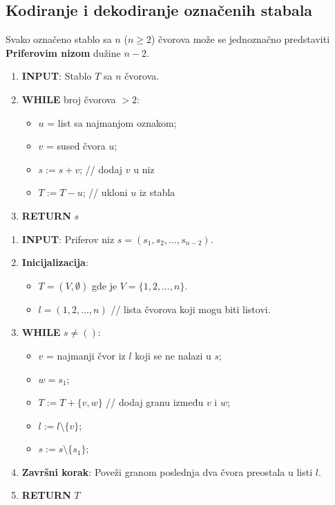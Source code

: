 \documentclass[a4paper,12pt,twoside]{report}
\numberwithin{algorithm}{section}
\begin{document}
\subsection{Kodiranje i dekodiranje označenih stabala}
Svako označeno stablo sa $n$ ($n \geq 2$) čvorova može se jednoznačno predstaviti \textbf{Priferovim nizom} dužine $n-2$.
\vfill
\begin{algorithm}[!h]
    \caption{Priferovo kodiranje}
    \begin{enumerate}
        \item \textbf{INPUT}: Stablo $T$ sa $n$ čvorova.
        \item \textbf{WHILE} broj čvorova $> 2$:
        \begin{itemize}
            \item $u$ = list sa najmanjom oznakom;
            \item $v$ = sused čvora $u$;
            \item $s := s + v$; // dodaj $v$ u niz
            \item $T := T - u$; // ukloni $u$ iz stabla
        \end{itemize}
        \item \textbf{RETURN} $s$
    \end{enumerate}
\end{algorithm}
\vfill
\newpage
\begin{algorithm}[!h]
    \caption{Priferovo dekodiranje}
    \begin{enumerate}
        \item \textbf{INPUT}: Priferov niz $s = (s_1, s_2, \ldots, s_{n-2})$.
        \item \textbf{Inicijalizacija}:
        \begin{itemize}
            \item $T = (V, \emptyset)$ gde je $V = \{1, 2, \ldots, n\}$.
            \item $l = (1, 2, \ldots, n)$ // lista čvorova koji mogu biti listovi.
        \end{itemize}
        \item \textbf{WHILE} $s \neq ()$:
        \begin{itemize}
            \item $v$ = najmanji čvor iz $l$ koji se ne nalazi u $s$;
            \item $w = s_1$;
            \item $T := T + \{v, w\}$ // dodaj granu između $v$ i $w$;
            \item $l := l \setminus \{v\}$;
            \item $s := s \setminus \{s_1\}$;
        \end{itemize}
        \item \textbf{Završni korak}: Poveži granom poslednja dva čvora preostala u listi $l$.
        \item \textbf{RETURN} $T$
    \end{enumerate}
\end{algorithm}
\end{document}
